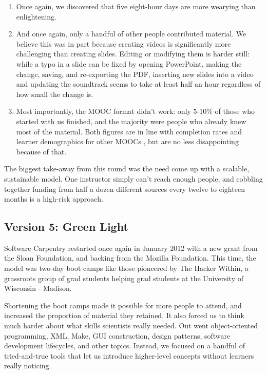 \documentclass[10pt,a4paper,twocolumn]{article}
\begin{document}
\begin{enumerate}
\item
  Once again, we discovered that five eight-hour days are more wearying
  than enlightening.
\item
  And once again, only a handful of other people contributed material.
  We believe this was in part because creating videos is significantly
  more challenging than creating slides. Editing or modifying them is
  harder still: while a typo in a slide can be fixed by opening
  PowerPoint, making the change, saving, and re-exporting the PDF,
  inserting new slides into a video and updating the soundtrack seems to
  take at least half an hour regardless of how small the change is.
\item
  Most importantly, the MOOC format didn't work: only 5-10\% of those
  who started with us finished, and the majority were people who already
  knew most of the material. Both figures are in line with completion
  rates and learner demographics for other MOOCs \cite{jordan2013}, but
  are no less disappointing because of that.
\end{enumerate}

The biggest take-away from this round was the need come up with a
scalable, sustainable model. One instructor simply can't reach enough
people, and cobbling together funding from half a dozen different
sources every twelve to eighteen months is a high-risk approach.

\subsection*{Version 5: Green Light}

Software Carpentry restarted once again in January 2012 with a new grant
from the Sloan Foundation, and backing from the Mozilla Foundation. This
time, the model was two-day boot camps like those pioneered by The
Hacker Within, a grassroots group of grad students helping grad students
at the University of Wisconsin - Madison.

Shortening the boot camps made it possible for more people to attend,
and increased the proportion of material they retained. It also forced
us to think much harder about what skills scientists really needed. Out
went object-oriented programming, XML, Make, GUI construction, design
patterns, software development lifecycles, and other topics. Instead, we
focused on a handful of tried-and-true tools that let us introduce
higher-level concepts without learners really noticing.
\end{document}
